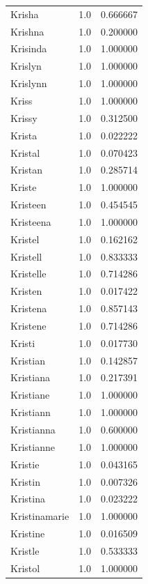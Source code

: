 \documentclass[
  letterpaper,
  DIV=11,
  numbers=noendperiod]{scrreprt}
\begin{document}
\begin{tabular}{lrr}
Krisha          &   1.0 &   0.666667 \\
Krishna         &   1.0 &   0.200000 \\
Krisinda        &   1.0 &   1.000000 \\
Krislyn         &   1.0 &   1.000000 \\
Krislynn        &   1.0 &   1.000000 \\
Kriss           &   1.0 &   1.000000 \\
Krissy          &   1.0 &   0.312500 \\
Krista          &   1.0 &   0.022222 \\
Kristal         &   1.0 &   0.070423 \\
Kristan         &   1.0 &   0.285714 \\
Kriste          &   1.0 &   1.000000 \\
Kristeen        &   1.0 &   0.454545 \\
Kristeena       &   1.0 &   1.000000 \\
Kristel         &   1.0 &   0.162162 \\
Kristell        &   1.0 &   0.833333 \\
Kristelle       &   1.0 &   0.714286 \\
Kristen         &   1.0 &   0.017422 \\
Kristena        &   1.0 &   0.857143 \\
Kristene        &   1.0 &   0.714286 \\
Kristi          &   1.0 &   0.017730 \\
Kristian        &   1.0 &   0.142857 \\
Kristiana       &   1.0 &   0.217391 \\
Kristiane       &   1.0 &   1.000000 \\
Kristiann       &   1.0 &   1.000000 \\
Kristianna      &   1.0 &   0.600000 \\
Kristianne      &   1.0 &   1.000000 \\
Kristie         &   1.0 &   0.043165 \\
Kristin         &   1.0 &   0.007326 \\
Kristina        &   1.0 &   0.023222 \\
Kristinamarie   &   1.0 &   1.000000 \\
Kristine        &   1.0 &   0.016509 \\
Kristle         &   1.0 &   0.533333 \\
Kristol         &   1.0 &   1.000000 \\

\end{tabular}
\end{document}
